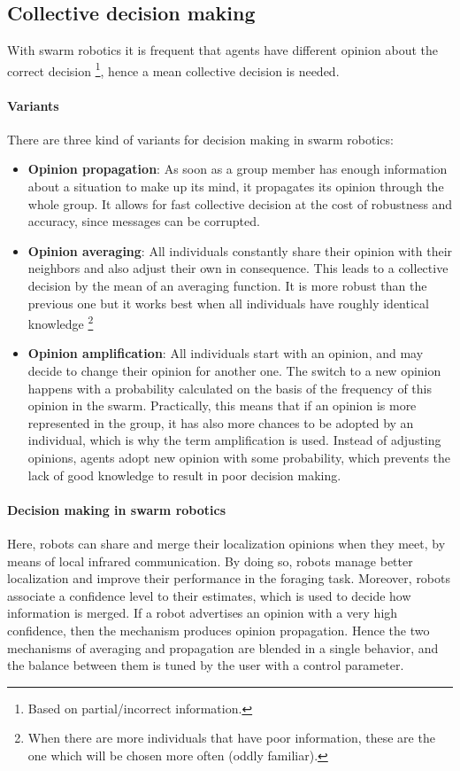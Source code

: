 \documentclass[10pt,a4paper]{article}
\begin{document}
\subsection{Collective decision making}
With swarm robotics it is frequent that agents have different opinion about the correct decision \footnote{Based on partial/incorrect information.}, hence a mean collective decision is needed.

\paragraph{Variants}
There are three kind of variants for decision making in swarm robotics:
\begin{itemize}
\item \textbf{Opinion propagation}: As soon as a group member has enough information about a situation to make up its mind, it propagates its opinion through the whole group. It allows for fast collective decision at the cost of robustness and accuracy, since messages can be corrupted.




\item \textbf{Opinion averaging}: All individuals constantly share their opinion with their neighbors and also adjust their own in consequence. This leads to a collective decision by the mean of an averaging function. It is more robust than the previous one but it works best when all individuals have roughly identical knowledge \footnote{When there are more individuals that have poor information, these are the one which will be chosen more often (oddly familiar).}


\item \textbf{Opinion amplification}:  All individuals start with an opinion, and may decide to change their opinion for another one. The switch to a new opinion happens with a probability calculated on the basis of the frequency of this opinion in the swarm. Practically, this means that if an opinion is more represented in the group, it has also more chances to be adopted by an individual, which is why the term amplification is used. Instead of adjusting opinions, agents adopt new opinion with some probability, which prevents the lack of good knowledge to result in poor decision making.
\end{itemize}

\paragraph{Decision making in swarm robotics}
Here, robots can share and merge their localization opinions when they meet, by means of local infrared communication. By doing so, robots manage better localization and improve their performance in the foraging task. Moreover, robots associate a confidence level to their estimates, which is used to decide how information is merged. If a robot advertises an opinion with a very high confidence, then the mechanism produces opinion propagation. Hence the two mechanisms of averaging and propagation are blended in a single behavior, and the balance between them is tuned by the user with a control parameter.
\end{document}
